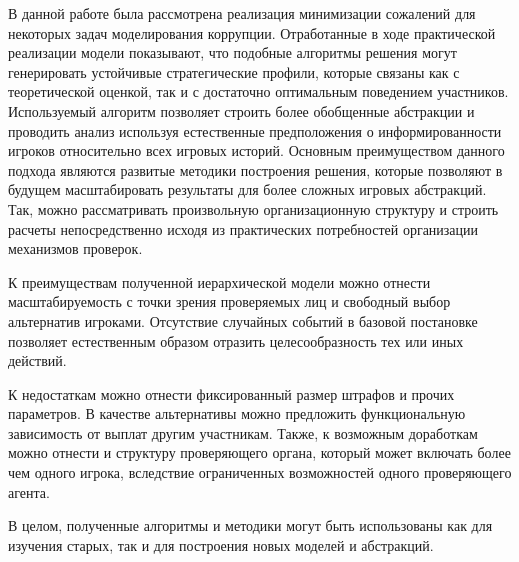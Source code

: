 \Conclusion %
\par
В данной работе была рассмотрена реализация минимизации сожалений для некоторых задач моделирования коррупции. Отработанные в ходе практической реализации модели показывают, что подобные алгоритмы решения могут генерировать устойчивые стратегические профили, которые связаны как с теоретической оценкой, так и с достаточно оптимальным поведением участников. Используемый алгоритм позволяет строить более обобщенные абстракции и проводить анализ используя естественные предположения о информированности игроков относительно всех игровых историй. Основным преимуществом данного подхода являются развитые методики построения решения, которые позволяют в будущем масштабировать результаты для более сложных игровых абстракций. Так, можно	рассматривать произвольную организационную структуру и строить расчеты непосредственно исходя из практических потребностей организации механизмов проверок.
\par
К преимуществам полученной иерархической модели можно отнести масштабируемость с точки зрения проверяемых лиц и свободный выбор альтернатив игроками. Отсутствие случайных событий в базовой постановке позволяет естественным образом отразить целесообразность тех или иных действий. 
\par
К недостаткам можно отнести фиксированный размер штрафов и прочих параметров. В качестве альтернативы можно предложить функциональную зависимость от выплат другим участникам. Также, к возможным доработкам можно отнести и структуру проверяющего органа, который может включать более чем одного игрока, вследствие ограниченных возможностей одного проверяющего агента.
\par 
В целом, полученные алгоритмы и методики могут быть использованы как для изучения старых, так и для построения новых моделей и абстракций. 